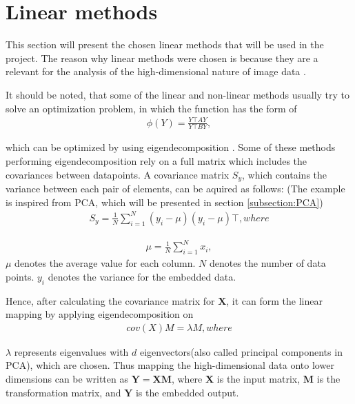 \section{Linear methods}\label{section:linear_methods}
This section will present the chosen linear methods that will be used in the project. The reason why linear methods were chosen is because they are a relevant for the analysis of the high-dimensional nature of image data \cite{linear-dimensionality-reduction-insights}.

It should be noted, that some of the linear and non-linear methods usually try to solve an optimization problem, in which the function has the form of 
\begin{align}
  \phi(Y) = \frac{Y \top AY}{Y \top BY},
\end{align}

which can be optimized by using eigendecomposition \cite{dimensionality-reduction-comparative-review}. Some of these methods performing eigendecomposition rely on a full matrix which includes the covariances between datapoints. A covariance matrix $S_y$, which contains the variance between each pair of elements, can be aquired as follows: (The example is inspired from PCA, which will be presented in section \ref{subsection:PCA})
\begin{align}
  S_y = \frac{1}{N}\sum\limits_{i=1}^{N}(y_i - \mu)(y_i - \mu)\top, where 
\end{align}

\begin{align}
  \mu = \frac{1}{N}\sum\limits_{i=1}^{N}x_i,
\end{align}
$\mu$ denotes the average value for each column. $N$ denotes the number of data points. $y_i$ denotes the variance for the embedded data.

Hence, after calculating the covariance matrix for $\mathbf{X}$, it can form the linear mapping by applying eigendecomposition on
\begin{align}
  cov(X)M = \lambda M, where
\end{align}

$\lambda$ represents eigenvalues with $d$ eigenvectors(also called principal components in PCA), which are chosen. Thus mapping the high-dimensional data onto lower dimensions can be written as $\mathbf{Y=XM}$, where $\mathbf{X}$ is the input matrix, $\mathbf{M}$ is the transformation matrix, and $\mathbf{Y}$ is the embedded output.


\begin{comment}
@misc{linear-dimensionality-reduction-insights,
      organization = {Journal of Machine Learning Research},
      url          = {https://stat.columbia.edu/~cunningham/pdf/CunninghamJMLR2015.pdf},
      title        = {Linear Dimensionality Reduction:Survey, Insights, and Generalizations},
      author       = {John P. Cunningham, Zoubin Ghahramani},
      urldate      = {2022-10-11}
    }
\end{comment}

